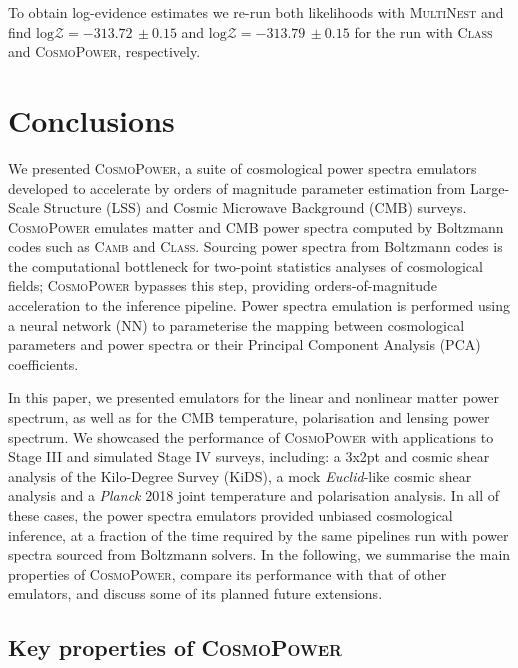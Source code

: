 \documentclass[fleqn,usenatbib]{mnras}
\begin{document}
To obtain log-evidence estimates we re-run both likelihoods with \textsc{MultiNest} and find $\mathrm{log} \mathcal{Z} = -313.72\, \pm 0.15$ and $\mathrm{log} \mathcal{Z} = -313.79 \, \pm 0.15$ for the run with \textsc{Class} and \textsc{CosmoPower}, respectively.


\section{Conclusions}\label{sec:conclusions}

We presented \textsc{CosmoPower}, a suite of cosmological power spectra emulators developed to accelerate by orders of magnitude parameter estimation from Large-Scale Structure (LSS) and Cosmic Microwave Background (CMB) surveys. \textsc{CosmoPower} emulates matter and CMB power spectra computed by Boltzmann codes such as \textsc{Camb} and \textsc{Class}. Sourcing power spectra from Boltzmann codes is the computational bottleneck for two-point statistics analyses of cosmological fields; \textsc{CosmoPower} bypasses this step, providing orders-of-magnitude acceleration to the inference pipeline. Power spectra emulation is performed using a neural network (NN) to parameterise the mapping between cosmological parameters and power spectra or their Principal Component Analysis (PCA) coefficients. 

In this paper, we presented emulators for the linear and nonlinear matter power spectrum, as well as for the CMB temperature, polarisation and lensing power spectrum. We showcased the performance of \textsc{CosmoPower} with applications to Stage III and simulated Stage IV surveys, including: a 3x2pt and cosmic shear analysis of the Kilo-Degree Survey (KiDS), a mock \textit{Euclid}-like cosmic shear analysis and a \textit{Planck} 2018 joint temperature and polarisation analysis. In all of these cases, the power spectra emulators provided unbiased cosmological inference, at a fraction of the time required by the same pipelines run with power spectra sourced from Boltzmann solvers. In the following, we summarise the main properties of \textsc{CosmoPower}, compare its performance with that of other emulators, and discuss some of its planned future extensions.

\subsection{Key properties of \textsc{CosmoPower}}
\end{document}
